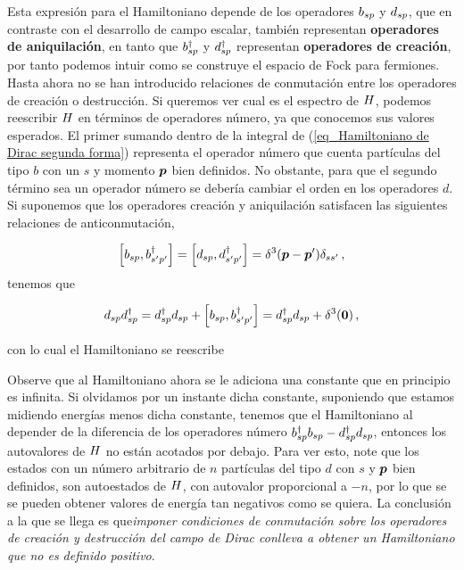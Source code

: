 Esta expresión para el Hamiltoniano depende de los operadores $b_{sp}$ y $d_{sp}$, que en contraste con el desarrollo de campo escalar, también representan \textbf{operadores de aniquilación}, en tanto que $b_{sp}^\dag$ y $d_{sp}^\dag$ representan \textbf{operadores de creación}, por tanto podemos intuir como se construye el espacio de Fock para fermiones.\\

Hasta ahora no se han introducido relaciones de conmutación entre los operadores de creación o destrucción. Si queremos ver cual es el espectro de $H$, podemos reescribir $H$ en términos de operadores número, ya que conocemos sus valores esperados. El primer sumando dentro de la integral de (\ref{eq_Hamiltoniano de Dirac segunda forma}) representa el operador número que cuenta partículas del tipo $b$ con un $s$ y momento $\vb*{p}$ bien definidos. No obstante, para que el segundo término sea un operador número se debería cambiar el orden en los operadores $d$. Si suponemos que los operadores creación y aniquilación satisfacen las siguientes relaciones de anticonmutación,

\begin{equation*}
	\comm{\Ob_{sp}}{\Ob^\dag_{\spr  \pp}} = \comm{\Od_{sp}}{\Od^\dag_{\spr  \pp}} = \ddiracp \delta_{s \spr} \, ,
\end{equation*}
tenemos que 

\begin{equation*}
	\Od_{sp} \Od_{sp}^\dag =\Od_{sp}^\dag \Od_{sp} +  \comm{\Ob_{sp}}{\Ob^\dag_{\spr  \pp}} = \Od_{sp}^\dag \Od_{sp} + \delta^3 (\vb*{0}) \, ,  
\end{equation*}
  
 con lo cual el Hamiltoniano se reescribe
  
  
Observe que al Hamiltoniano ahora se le adiciona una constante que en principio es infinita. Si olvidamos por un instante dicha constante, suponiendo que estamos midiendo energías menos dicha constante, tenemos que el Hamiltoniano al depender de la diferencia de los operadores número $b^\dag_{sp} b_{sp} - d^\dag_{sp} d_{sp}$, entonces los autovalores de $H$ no están acotados por debajo. Para ver esto, note que los estados con un número arbitrario de $n$ partículas del tipo $d$ con $s$ y $\vb*{p}$ bien definidos, son autoestados de $H$, con autovalor proporcional a $-n$, por lo que se se pueden obtener valores de energía tan negativos como se quiera. La conclusión a la que se llega es que\emph{imponer condiciones de conmutación sobre los operadores de creación y destrucción del campo de Dirac conlleva a obtener un Hamiltoniano que no es definido positivo}.\\

